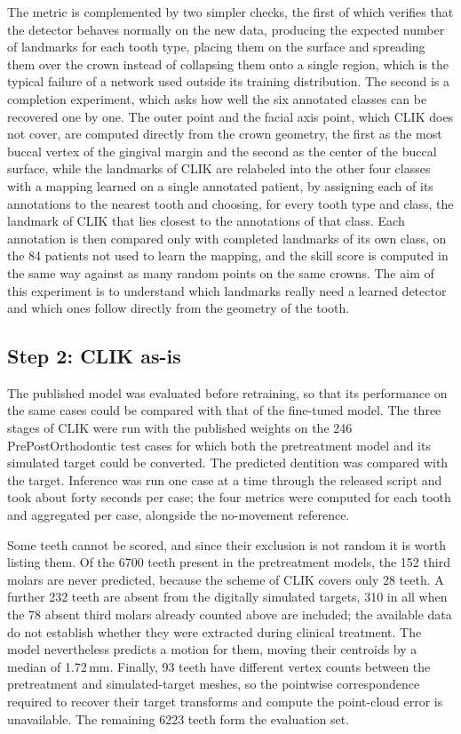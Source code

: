 \documentclass[10pt,a4paper]{article}
\begin{document}
The metric is complemented by two simpler checks, the first of which verifies that the detector behaves normally on the new data, producing the expected number of landmarks for each tooth type, placing them on the surface and spreading them over the crown instead of collapsing them onto a single region, which is the typical failure of a network used outside its training distribution. The second is a completion experiment, which asks how well the six annotated classes can be recovered one by one. The outer point and the facial axis point, which CLIK does not cover, are computed directly from the crown geometry, the first as the most buccal vertex of the gingival margin and the second as the center of the buccal surface, while the landmarks of CLIK are relabeled into the other four classes with a mapping learned on a single annotated patient, by assigning each of its annotations to the nearest tooth and choosing, for every tooth type and class, the landmark of CLIK that lies closest to the annotations of that class. Each annotation is then compared only with completed landmarks of its own class, on the 84 patients not used to learn the mapping, and the skill score is computed in the same way against as many random points on the same crowns. The aim of this experiment is to understand which landmarks really need a learned detector and which ones follow directly from the geometry of the tooth.

\subsection{Step 2: CLIK as-is}

The published model was evaluated before retraining, so that its performance on the same cases could be compared with that of the fine-tuned model. The three stages of CLIK were run with the published weights on the 246 PrePostOrthodontic test cases for which both the pretreatment model and its simulated target could be converted. The predicted dentition was compared with the target. Inference was run one case at a time through the released script and took about forty seconds per case; the four metrics were computed for each tooth and aggregated per case, alongside the no-movement reference.

Some teeth cannot be scored, and since their exclusion is not random it is worth listing them. Of the 6700 teeth present in the pretreatment models, the 152 third molars are never predicted, because the scheme of CLIK covers only 28 teeth. A further 232 teeth are absent from the digitally simulated targets, 310 in all when the 78 absent third molars already counted above are included; the available data do not establish whether they were extracted during clinical treatment. The model nevertheless predicts a motion for them, moving their centroids by a median of 1.72\,mm. Finally, 93 teeth have different vertex counts between the pretreatment and simulated-target meshes, so the pointwise correspondence required to recover their target transforms and compute the point-cloud error is unavailable. The remaining 6223 teeth form the evaluation set.
\end{document}
